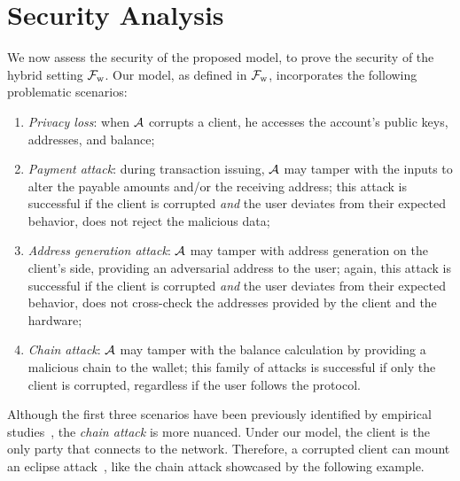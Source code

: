 \section{Security Analysis}\label{sec:theorem}

We now assess the security of the proposed model, to prove the security of the
hybrid setting \wrt $\mathcal{F}_{\mathrm{w}}$. Our model, as defined in $\mathcal{F}_{\mathrm{w}}$, incorporates the
following problematic scenarios:
\begin{enumerate}[1)]
    \item \label{item:privacy} \emph{Privacy loss}: when $\mathcal{A}$
        corrupts a client, he accesses the account's public keys, addresses, and
        balance;
    \item \label{item:payment} \emph{Payment attack}: during transaction
        issuing, $\mathcal{A}$ may tamper with the inputs to alter the payable
        amounts and/or the receiving address; this attack is successful if
        the client is corrupted \emph{and} the user deviates from their expected
        behavior, \ie does not reject the malicious data;
    \item \label{item:genAdd} \emph{Address generation attack}: $\mathcal{A}$
        may tamper with address generation on the client's side, providing an
        adversarial address to the user; again, this attack is successful if
        the client is corrupted \emph{and} the user deviates from their expected
        behavior, \ie does not cross-check the addresses provided by the client
        and the hardware;
    \item \label{item:balance} \emph{Chain attack}: $\mathcal{A}$ may tamper
        with the balance calculation by providing a malicious chain to the
        wallet; this family of attacks is successful if only the client is
        corrupted, \ie regardless if the user follows the protocol.
\end{enumerate}

Although the first three scenarios have been previously identified by empirical
studies~\cite{receiveAttack,ISC:GkaAraKia17}, the \emph{chain attack} is more
nuanced. Under our model, the client is the only party that connects to the
network. Therefore, a corrupted client can mount an eclipse
attack~\cite{USENIX:HKZG15}, like the chain attack showcased by the following
example.

